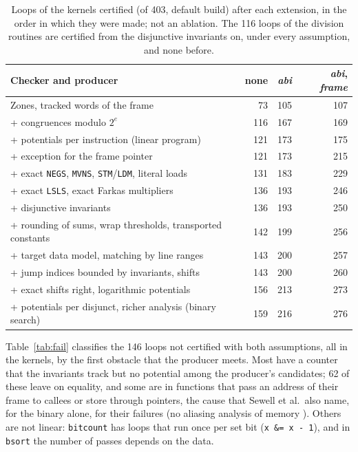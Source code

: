 \documentclass[oneside,english]{amsart}
\numberwithin{equation}{section}
\theoremstyle{plain}
\theoremstyle{definition}
\theoremstyle{plain}
\theoremstyle{plain}
\theoremstyle{remark}
\begin{document}
\begin{table}[ht]
\centering
\small
\begin{tabular}{@{}lrrr@{}}
\toprule
Checker and producer & none & \emph{abi} & \emph{abi}, \emph{frame} \\
\midrule
Zones, tracked words of the frame & 73 & 105 & 107 \\
\quad + congruences modulo $2^e$ & 116 & 167 & 169 \\
\quad + potentials per instruction (linear program) & 121 & 173 & 175 \\
\quad + exception for the frame pointer & 121 & 173 & 215 \\
\quad + exact \texttt{NEGS}, \texttt{MVNS}, \texttt{STM}/\texttt{LDM}, literal loads & 131 & 183 & 229 \\
\quad + exact \texttt{LSLS}, exact Farkas multipliers & 136 & 193 & 246 \\
\quad + disjunctive invariants & 136 & 193 & 250 \\
\quad + rounding of sums, wrap thresholds, transported constants & 142 & 199 & 256 \\
\quad + target data model, matching by line ranges & 143 & 200 & 257 \\
\quad + jump indices bounded by invariants, shifts & 143 & 200 & 260 \\
\quad + exact shifts right, logarithmic potentials & 156 & 213 & 273 \\
\quad + potentials per disjunct, richer analysis (binary search) & 159 & 216 & 276 \\
\bottomrule
\end{tabular}
\caption{Loops of the kernels certified (of 403, default build) after each extension, in the order in which they were made; not an ablation. The 116 loops of the division routines are certified from the disjunctive invariants on, under every assumption, and none before.}
\label{tab:steps}
\end{table}

Table~\ref{tab:fail} classifies the 146 loops not certified with both assumptions, all in the kernels, by the first obstacle that the producer meets. Most have a counter that the invariants track but no potential among the producer's candidates; 62 of these leave on equality, and some are in functions that pass an address of their frame to callees or store through pointers, the cause that Sewell et al.\ also name, for the binary alone, for their failures (no aliasing analysis of memory \cite{sewell2016complete}). Others are not linear: \texttt{bitcount} has loops that run once per set bit (\texttt{x \&= x - 1}), and in \texttt{bsort} the number of passes depends on the data.
\end{document}
